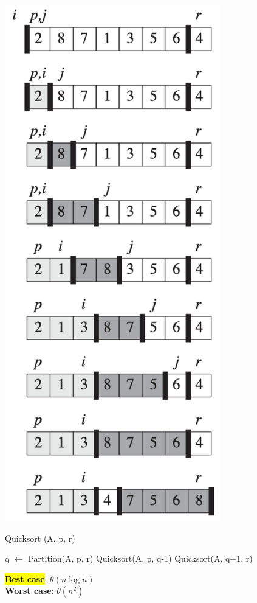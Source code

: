 \begin{minipage}[H]{0.28\textwidth}
    \centering
    \vspace{-1em}
    \includegraphics[width=0.7\textwidth]{assets/quicksort.png}
\end{minipage}

\cite{cormen2022introduction}

\begin{algorithm}[H]
    \caption{Quicksort (A, p, r)}
    \begin{algorithmic}[1]
            \State q $\gets$ Partition(A, p, r)
            \State Quicksort(A, p, q-1)
            \State Quicksort(A, q+1, r)
        \EndIf
    \end{algorithmic}
    \hl
    \textbf{Best case}: $\theta(n\log n)$ \\
    \textbf{Worst case}: $\theta(n^2)$
\end{algorithm}

